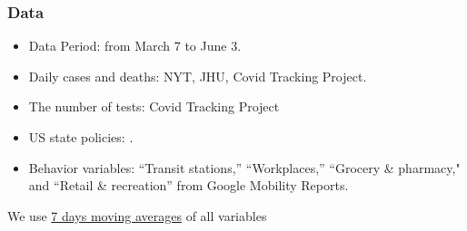 \documentclass{beamer}
\def\bcolor{\color{forestgreen(web)}}
\def\pcolor{\color{blue}}
\def\wcolor{\color{gray}}
\def\ycolor{\color{red}}
\begin{document}
\begin{frame}
  \frametitle{Data}\vspace{-0.05cm} 
  
  \begin{itemize}
  \item Data Period: from March 7 to June 3.\medskip
  \item {\ycolor Daily cases and deaths}: NYT, JHU, Covid Tracking Project.\medskip
  \item {\wcolor The number of tests}: Covid Tracking Project\medskip
  \item  {\pcolor US state policies}:
\cite{raifman2020}.\medskip
\item {\bcolor Behavior variables}:  ``Transit stations,''  ``Workplaces,''  ``Grocery \& pharmacy," and ``Retail \& recreation'' from Google Mobility Reports.  
  \end{itemize} 
  
We use  \underline{7 days moving averages} of all variables %
%   

\end{frame}
 


\end{document}

